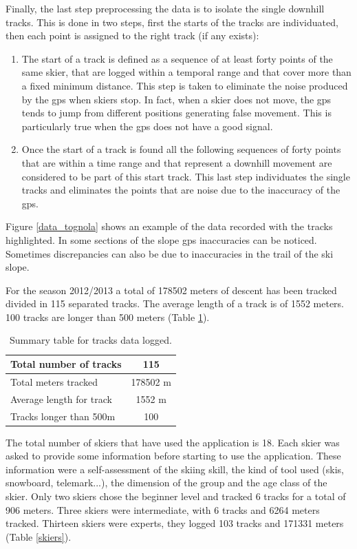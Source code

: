 \documentclass[12pt,a4paper,twoside]{book}
\begin{document}
Finally, the last step preprocessing the data is to isolate the single downhill tracks. This is done in two steps, first the starts of the tracks are individuated, then each point is assigned to the right track (if any exists):
\begin{enumerate}
\item The start of a track is defined as a sequence of at least forty points of the same skier, that are logged within a temporal range and that cover more than a fixed minimum distance. This step is taken to eliminate the noise produced by the gps when skiers stop. In fact, when a skier does not move, the gps tends to jump from different positions generating false movement. This is particularly true when the gps does not have a good signal.
\item Once the start of a track is found all the following sequences of forty points that are within a time range and that represent a downhill movement are considered to be part of this start track. This last step individuates the single tracks and eliminates the points that are noise due to the inaccuracy of the gps.
\end{enumerate}

Figure \ref{data_tognola} shows an example of the data recorded with the tracks highlighted. In some sections of the slope gps inaccuracies can be noticed. Sometimes discrepancies can also be due to inaccuracies in the trail of the ski slope.

For the season 2012/2013 a total of 178502 meters of descent has been tracked divided in 115 separated tracks. The average length of a track is of 1552 meters. 100 tracks are longer than 500 meters (Table \ref{descendts}).

\begin{table}[!h]
  \centering
  \begin{tabular}{ | l | c | }
    \hline
    Total number of tracks & 115 \\ \hline
    Total meters tracked & 178502 m \\ \hline
    Average length for track & 1552 m \\ \hline
    Tracks longer than 500m & 100 \\
    \hline
  \end{tabular}
  \caption{Summary table for tracks data logged.}
  \label{descendts}
\end{table}

The total number of skiers that have used the application is 18. Each skier was asked to provide some information before starting to use the application. These information were a self-assessment of the skiing skill, the kind of tool used (skis, snowboard, telemark...), the dimension of the group and the age class of the skier. Only two skiers chose the beginner level and tracked 6 tracks for a total of 906 meters. Three skiers were intermediate, with 6 tracks and 6264 meters tracked. Thirteen skiers were experts, they logged 103 tracks and 171331 meters (Table \ref{skiers}).
\end{document}
